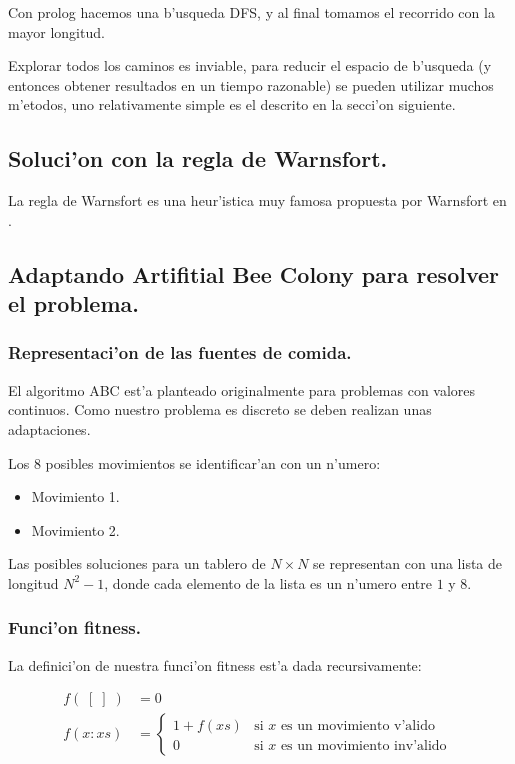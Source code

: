 \documentclass[12pt]{article}
\begin{document}
    Con prolog hacemos una b'usqueda DFS, y al final tomamos
    el recorrido con la mayor longitud.

    Explorar todos los caminos es inviable, para reducir el espacio
    de b'usqueda (y entonces obtener resultados en un tiempo razonable)
    se pueden utilizar muchos m'etodos, uno relativamente
    simple es el descrito en la secci'on siguiente.



    \subsection{Soluci'on con la regla de Warnsfort.}
    La regla de Warnsfort es una heur'istica
    muy famosa propuesta por Warnsfort en .


    \subsection{Adaptando Artifitial Bee Colony para resolver el problema.}

    \subsubsection{Representaci'on de las fuentes de comida.}

    El algoritmo ABC est'a planteado originalmente para problemas con valores continuos. Como nuestro problema es discreto
    se deben realizan unas adaptaciones.


    Los 8 posibles movimientos se identificar'an con un n'umero:
    \begin{itemize}
        \item Movimiento 1.
        \item Movimiento 2.
    \end{itemize}


    Las posibles  soluciones para un tablero de $N \times N$
    se representan con una lista de longitud $N^{2} -1 $, donde
    cada elemento de la lista es un n'umero entre $1$ y $8$.

    \subsubsection{Funci'on fitness.}

    La definici'on de nuestra funci'on fitness est'a dada recursivamente:

    \begin{equation} \label{eq: fitness}
        \begin{split}
            f(\; [\;] \;) &= 0 \\
            f( x:xs ) &= \begin{cases}
                            1 + f(xs) &\text{si $x$ es un movimiento v'alido}\\
                            0 &\text{si $x$ es un movimiento inv'alido }
            \end{cases}
        \end{split}
    \end{equation}
\end{document}
